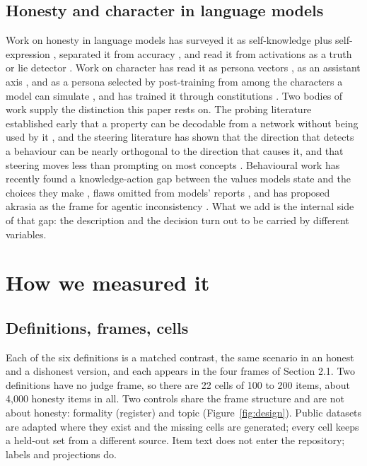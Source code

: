 \documentclass[11pt]{article}
\begin{document}
\subsection{Honesty and character in language models}

Work on honesty in language models has surveyed it as self-knowledge plus self-expression \citep{li2024honesty},
separated it from accuracy \citep{ren2025mask,evans2021truthful}, and read it from activations as a truth or lie
detector \citep{burns2022ccs,azaria2023,marks2023geometry,goldowskydill2025}. Work on character has read it as persona
vectors \citep{chen2025persona}, as an assistant axis \citep{lu2026assistant}, and as a persona selected by
post-training from among the characters a model can simulate \citep{marks2026psm,danilov2026names}, and has trained it
through constitutions \citep{maiya2025oct}. Two bodies of work supply the distinction this paper rests on. The probing
literature established early that a property can be decodable from a network without being used by it
\citep{hewitt2019control,ravichander2021,elazar2021amnesic,belinkov2022}, and the steering literature has shown that
the direction that detects a behaviour can be nearly orthogonal to the direction that causes it, and that steering
moves less than prompting on most concepts \citep{galeone2026,wu2025axbench}. Behavioural work has recently found a
knowledge-action gap between the values models state and the choices they make \citep{huang2026knowing}, flaws
omitted from models' reports \citep{huang2026insecure}, and has proposed akrasia as the frame for agentic
inconsistency \citep{yang2025akrasia}. What we add is the internal side of that gap: the description and the decision
turn out to be carried by different variables.

\section{How we measured it}

\subsection{Definitions, frames, cells}

Each of the six definitions is a matched contrast, the same scenario in an honest and a dishonest version, and each
appears in the four frames of Section 2.1. Two definitions have no judge frame, so there are 22 cells of 100 to 200
items, about 4{,}000 honesty items in all. Two controls share the frame structure and are not about honesty: formality
(register) and topic (Figure~\ref{fig:design}). Public datasets are adapted where they exist
\citep{ren2025mask,yin2023selfaware,amayuelas2023kuq,lee2024trait,sharma2023} and the missing cells are generated;
every cell keeps a held-out set from a different source. Item text does not enter the repository; labels and
projections do.
\end{document}
